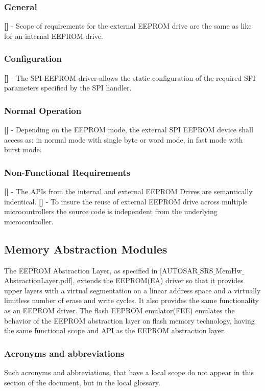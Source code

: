 \subsubsection{General}
{\bf []} - Scope of requirements for the external EEPROM drive are the same as like for an internal EEPROM drive.
\subsubsection{Configuration}
{\bf []} - The SPI EEPROM driver allows the static configuration of the required SPI parameters specified by the \mbox{SPI} handler.
\subsubsection{Normal Operation}
{\bf []} - Depending on the EEPROM mode, the external SPI EEPROM device shall access as: in normal mode with single byte or word mode, in fast mode with burst mode.
\subsubsection{Non-Functional Requirements}
{\bf []} - The APIs from the internal and external EEPROM Drives are semantically indentical.\newline
\newline
{\bf []} - To insure the reuse of external EEPROM drive across multiple microcontrollers the source code is independent from the underlying microcontroller.

\newpage
\subsection{Memory Abstraction Modules}
The EEPROM Abstraction Layer, as specified in  [AUTOSAR$\_$SRS$\_$MemHw$\_$AbstractionLayer.pdf],  extends the EEPROM(EA) driver  so that it provides upper layers with a virtual segmentation on a linear address space and a virtually limitless number of erase and write cycles. It also provides the same functionality as an \mbox{EEPROM} driver.\newline
The flash EEPROM emulator(FEE) emulates the behavior of the EEPROM abstraction layer on flash memory technology, having the same functional scope and API as the EEPROM abstraction layer.\newline
\subsubsection{Acronyms and abbreviations}
Such acronyms and abbreviations, that have a local scope do not appear in this section of the document, but in the local glossary.

